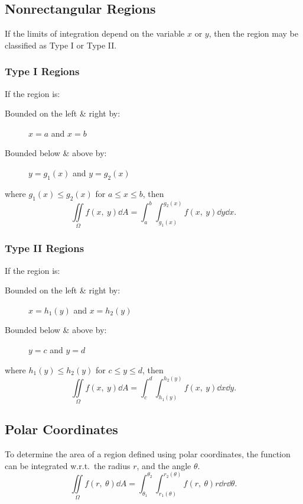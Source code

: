 \documentclass{article}
\begin{document}
\subsection{Nonrectangular Regions}
If the limits of integration depend on the variable \(x\) or \(y\), then the region
may be classified as Type I or Type II\@.
\subsubsection{Type I Regions}
If the region is:
\begin{description}
    \item[Bounded on the left \& right by:] \(x=a\) and \(x=b\)
    \item[Bounded below \& above by:] \(y=g_1(x)\) and \(y=g_2(x)\)
\end{description}
where \(g_1(x) \leq g_2(x)\) for \(a \leq x \leq b\), then
\begin{equation*}
    \iint\limits_{\Omega} f(x,\: y) \dd{A} = \int_a^b\int_{g_1(x)}^{g_2(x)} f(x,\: y) \dd{y} \dd{x}.
\end{equation*}
\subsubsection{Type II Regions}
If the region is:
\begin{description}
    \item[Bounded on the left \& right by:] \(x=h_1(y)\) and \(x=h_2(y)\)
    \item[Bounded below \& above by:] \(y=c\) and \(y=d\)
\end{description}
where \(h_1(y) \leq h_2(y)\) for \(c \leq y \leq d\), then
\begin{equation*}
    \iint\limits_{\Omega} f(x,\: y) \dd{A} = \int_c^d\int_{h_1(y)}^{h_2(y)} f(x,\: y) \dd{x} \dd{y}.
\end{equation*}
\subsection{Polar Coordinates}
To determine the area of a region defined using polar coordinates,
the function can be integrated w.r.t.\ the radius \(r\), and the angle \(\theta\).
\begin{equation*}
    \iint\limits_{\Omega} f(r,\: \theta) \dd{A} = \int_{\theta_1}^{\theta_2}\int_{r_1(\theta)}^{r_2(\theta)} f\left(r,\: \theta\right) r \dd{r} \dd{\theta}.
\end{equation*}
\end{document}
